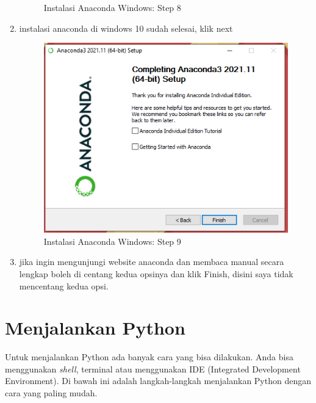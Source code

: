 \begin{enumerate}
\begin{figure}[H]
        \caption{Instalasi Anaconda Windows: Step 8}
\end{figure}
\item instalasi anaconda di windows 10 sudah selesai, klik next
\begin{figure}[H]
        \centerline{\includegraphics[scale=0.75]{figures/instalasi-anaconda-windows/step9}}
        \caption{Instalasi Anaconda Windows: Step 9}
\end{figure}
\item jika ingin mengunjungi website anaconda dan membaca manual secara lengkap boleh di centang kedua opsinya dan klik Finish, disini saya tidak mencentang kedua opsi.
\end{enumerate}

\section{Menjalankan Python}
Untuk menjalankan Python ada banyak cara yang bisa dilakukan. Anda bisa menggunakan \textit{shell}, terminal atau menggunakan IDE (Integrated Development Environment). Di bawah ini adalah langkah-langkah menjalankan Python dengan cara yang paling mudah.

